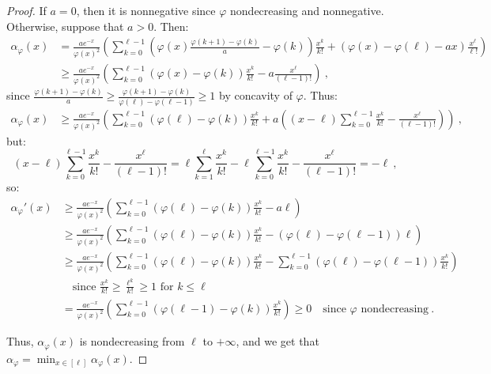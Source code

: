 \begin{proof}
  If $a=0$, then it is nonnegative since $\varphi$ nondecreasing and nonnegative. Otherwise, suppose that $a > 0$. Then:
  \begin{equation}
    \begin{aligned}
    \alpha_{\varphi}(x) &= \frac{ae^{-x}}{\varphi(x)^2} \left(\sum_{k=0}^{\ell-1}\left(\varphi(x)\frac{\varphi(k+1)- \varphi(k)}{a} - \varphi(k)\right)\frac{x^k}{k!} +\left(\varphi(x)-\varphi(\ell) - ax\right)\frac{x^{\ell}}{\ell!}\right)\\
    &\geq \frac{ae^{-x}}{\varphi(x)^2} \left(\sum_{k=0}^{\ell-1}\left(\varphi(x)- \varphi(k)\right)\frac{x^k}{k!} -a\frac{x^{\ell}}{(\ell-1)!}\right) \ ,
    \end{aligned}
  \end{equation}
since $\frac{\varphi(k+1)- \varphi(k)}{a} \geq \frac{\varphi(k+1)- \varphi(k)}{\varphi(\ell)-\varphi(\ell-1)} \geq 1$ by concavity of $\varphi$. Thus:
\begin{align*}
  \alpha_{\varphi}(x) &\geq \frac{ae^{-x}}{\varphi(x)^2} \left(\sum_{k=0}^{\ell-1}\left(\varphi(\ell)- \varphi(k)\right)\frac{x^k}{k!} +a\left((x-\ell)\sum_{k=0}^{\ell-1}\frac{x^k}{k!}-\frac{x^{\ell}}{(\ell-1)!}\right)\right) \ ,
  \end{align*}
but:
\[(x-\ell)\sum_{k=0}^{\ell-1}\frac{x^k}{k!}-\frac{x^{\ell}}{(\ell-1)!} = \ell\sum_{k=1}^{\ell}\frac{x^k}{k!} -\ell\sum_{k=0}^{\ell-1}\frac{x^k}{k!}-\frac{x^{\ell}}{(\ell-1)!} = - \ell \ ,\]
so:
 \begin{equation}
   \begin{aligned}
   \alpha_{\varphi}'(x) &\geq \frac{ae^{-x}}{\varphi(x)^2} \left(\sum_{k=0}^{\ell-1}\left(\varphi(\ell)- \varphi(k)\right)\frac{x^k}{k!} -a\ell \right)\\
   &\geq \frac{ae^{-x}}{\varphi(x)^2} \left(\sum_{k=0}^{\ell-1}\left(\varphi(\ell)- \varphi(k)\right)\frac{x^k}{k!} -(\varphi(\ell)-\varphi(\ell-1))\ell \right)\\
   &\geq \frac{ae^{-x}}{\varphi(x)^2} \left(\sum_{k=0}^{\ell-1}\left(\varphi(\ell)- \varphi(k)\right)\frac{x^k}{k!} - \sum_{k=0}^{\ell-1}(\varphi(\ell)-\varphi(\ell-1))\frac{x^k}{k!}\right)\\
   &\quad \text{since $\frac{x^k}{k!} \geq \frac{\ell^k}{k!} \geq 1$ for $k \leq \ell$}\\
   &= \frac{ae^{-x}}{\varphi(x)^2} \left(\sum_{k=0}^{\ell-1}\left(\varphi(\ell-1)- \varphi(k)\right)\frac{x^k}{k!}\right) \geq 0  \quad \text{since $\varphi$ nondecreasing} \ .
    \end{aligned}
  \end{equation}

 Thus, $\alpha_{\varphi}(x)$ is nondecreasing from $\ell$ to $+\infty$, and we get that $\alpha_{\varphi} = \min_{x \in [\ell]} \alpha_{\varphi}(x)$.
\end{proof}

